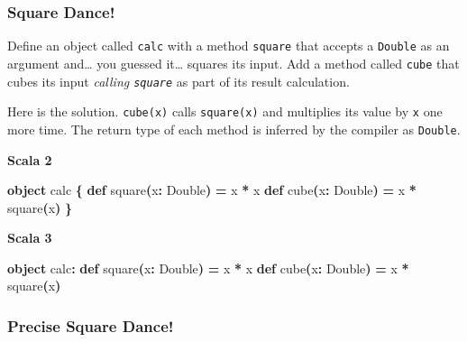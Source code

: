 \documentclass[11pt,a5paper,]{book}
\newenvironment{Shaded}{\begin{snugshade}}{\end{snugshade}}
\newcommand{\ExtensionTok}[1]{#1}
\newcommand{\FunctionTok}[1]{\textcolor[rgb]{0.00,0.00,0.00}{#1}}
\newcommand{\KeywordTok}[1]{\textcolor[rgb]{0.13,0.29,0.53}{\textbf{#1}}}
\newcommand{\NormalTok}[1]{#1}
\newcommand{\OperatorTok}[1]{\textcolor[rgb]{0.81,0.36,0.00}{\textbf{#1}}}
\begin{document}
\hypertarget{square-dance}{%
\subsubsection{Square Dance!}\label{square-dance}}

Define an object called \texttt{calc} with a method \texttt{square} that
accepts a \texttt{Double} as an argument and\ldots{} you guessed
it\ldots{} squares its input. Add a method called \texttt{cube} that
cubes its input \emph{calling \texttt{square}} as part of its result
calculation.

Here is the solution. \texttt{cube(x)} calls \texttt{square(x)} and
multiplies its value by \texttt{x} one more time. The return type of
each method is inferred by the compiler as \texttt{Double}.

\textbf{Scala 2}

\begin{Shaded}
\begin{Highlighting}[]
\KeywordTok{object}\NormalTok{ calc }\OperatorTok{\{}
  \KeywordTok{def} \FunctionTok{square}\OperatorTok{(}\NormalTok{x}\OperatorTok{:} \ExtensionTok{Double}\OperatorTok{)} \OperatorTok{=}\NormalTok{ x }\OperatorTok{*}\NormalTok{ x}
  \KeywordTok{def} \FunctionTok{cube}\OperatorTok{(}\NormalTok{x}\OperatorTok{:} \ExtensionTok{Double}\OperatorTok{)} \OperatorTok{=}\NormalTok{ x }\OperatorTok{*} \FunctionTok{square}\OperatorTok{(}\NormalTok{x}\OperatorTok{)}
\OperatorTok{\}}
\end{Highlighting}
\end{Shaded}

\textbf{Scala 3}

\begin{Shaded}
\begin{Highlighting}[]
\KeywordTok{object}\NormalTok{ calc}\OperatorTok{:}
  \KeywordTok{def} \FunctionTok{square}\OperatorTok{(}\NormalTok{x}\OperatorTok{:} \ExtensionTok{Double}\OperatorTok{)} \OperatorTok{=}\NormalTok{ x }\OperatorTok{*}\NormalTok{ x}
  \KeywordTok{def} \FunctionTok{cube}\OperatorTok{(}\NormalTok{x}\OperatorTok{:} \ExtensionTok{Double}\OperatorTok{)} \OperatorTok{=}\NormalTok{ x }\OperatorTok{*} \FunctionTok{square}\OperatorTok{(}\NormalTok{x}\OperatorTok{)}
\end{Highlighting}
\end{Shaded}

\hypertarget{precise-square-dance}{%
\subsubsection{Precise Square Dance!}\label{precise-square-dance}}
\end{document}
